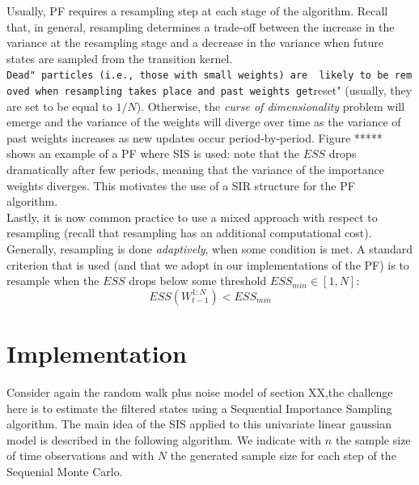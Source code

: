\documentclass[
]{book}
\theoremstyle{break}
\theoremstyle{nonumberplain}
\begin{document}
Usually, PF requires a resampling step at each stage of the algorithm.
Recall that, in general, resampling determines a trade-off between the
increase in the variance at the resampling stage and a decrease in the
variance when future states are sampled from the transition kernel.\\
\texttt{Dead"\ particles\ (i.e.,\ those\ with\ small\ weights)\ are\ \ likely\ to\ be\ removed\ when\ resampling\ takes\ place\ and\ past\ weights\ get}reset"
(usually, they are set to be equal to \(1/N\)). Otherwise, the
\textit{curse of dimensionality} problem will emerge and the variance of
the weights will diverge over time as the variance of past weights
increases as new updates occur period-by-period. Figure ***** shows an
example of a PF where SIS is used: note that the \(ESS\) drops
dramatically after few periods, meaning that the variance of the
importance weights diverges. This motivates the use of a SIR structure
for the PF algorithm.~\\
Lastly, it is now common practice to use a mixed approach with respect
to resampling (recall that resampling has an additional computational
cost). Generally, resampling is done \textit{adaptively}, when some
condition is met. A standard criterion that is used (and that we adopt
in our implementations of the PF) is to resample when the \(ESS\) drops
below some threshold \(ESS_{min}\in [1,N]\): \begin{equation}
    ESS(W_{t-1}^{1:N})<ESS_{min}
\end{equation}

\section{Implementation}

Consider again the random walk plus noise model of section XX,the
challenge here is to estimate the filtered states using a Sequential
Importance Sampling algorithm. The main idea of the SIS applied to this
univariate linear gaussian model is described in the following
algorithm. We indicate with \(n\) the sample size of time observations
and with \(N\) the generated sample size for each step of the Sequenial
Monte Carlo.
\end{document}
